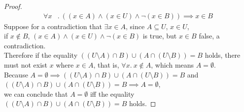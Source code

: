 \documentclass[12pt]{article}
\begin{document}
\begin{proof}
\begin{align*}
        \forall x&.~ ((x \in A) \land (x \in U) \land \lnot(x \in B)) \implies x \in B
    \end{align*}
    Suppose for a contradiction that $\exists x \in A$, since $A \subseteq U$, $x \in U$,\\
    if $x \not \in B$, $(x \in A) \land (x \in U) \land \lnot(x \in B)$ is true, but $x \in B$ false, a contradiction.\\
    Therefore if the equality $((U \setminus A) \cap B) \cup (A \cap (U \setminus B)) = B$ holds,
    there must not exist $x$ where $x \in A$, that is, $\forall x.~ x \not\in A$, which means $A = \emptyset$.\\
    Because $A = \emptyset \implies ((U \setminus A) \cap B) \cup (A \cap (U \setminus B)) = B$ and\\
    $((U \setminus A) \cap B) \cup (A \cap (U \setminus B)) = B \implies A = \emptyset$,\\
    we can conclude that $A = \emptyset$ iff the equality $((U \setminus A) \cap B) \cup (A \cap (U \setminus B)) = B$ holds.
\end{proof}
\newpage
\end{document}
